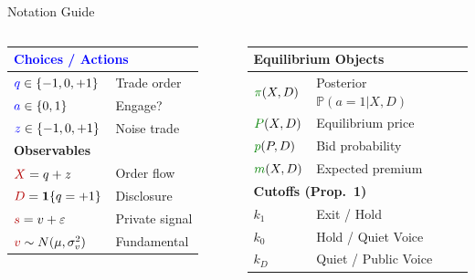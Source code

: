 \documentclass[aspectratio=169,10pt]{beamer}
\newcommand{\PP}{\mathbb{P}}
\newcommand{\1}{\mathbf{1}}
\newcommand{\choice}[1]{\textcolor{blue}{#1}}
\newcommand{\obs}[1]{\textcolor{red!70!black}{#1}}
\newcommand{\outcome}[1]{\textcolor{green!50!black}{#1}}
\begin{document}
\begin{frame}{Notation Guide}
\hypertarget{main:notation}{}
\tiny
\begin{columns}[T,onlytextwidth]
\begin{tabular}{@{}ll@{}}
\toprule
\multicolumn{2}{l}{\textbf{\choice{Choices / Actions}}} \\
\midrule
$\choice{q} \in \{-1,0,+1\}$ & Trade order \\
$\choice{a} \in \{0,1\}$ & Engage? \\
$\choice{z} \in \{-1,0,+1\}$ & Noise trade \\
\midrule
\multicolumn{2}{l}{\textbf{\obs{Observables}}} \\
\midrule
$\obs{X} = q + z$ & Order flow \\
$\obs{D} = \1\{q=+1\}$ & Disclosure \\
$\obs{s} = v + \varepsilon$ & Private signal \\
$\obs{v} \sim N(\mu,\sigma_v^2)$ & Fundamental \\
\bottomrule
\end{tabular}

\begin{tabular}{@{}ll@{}}
\toprule
\multicolumn{2}{l}{\textbf{\outcome{Equilibrium Objects}}} \\
\midrule
$\outcome{\pi}(X,D)$ & Posterior $\PP(a{=}1|X,D)$ \\
$\outcome{P}(X,D)$ & Equilibrium price \\
$\outcome{p}(P,D)$ & Bid probability \\
$\outcome{m}(X,D)$ & Expected premium \\
\midrule
\multicolumn{2}{l}{\textbf{Cutoffs (Prop.\ 1)}} \\
\midrule
$k_1$ & Exit / Hold \\
$k_0$ & Hold / Quiet Voice \\
$k_D$ & Quiet / Public Voice \\
\bottomrule
\end{tabular}


\end{columns}
\end{frame}
\end{document}

